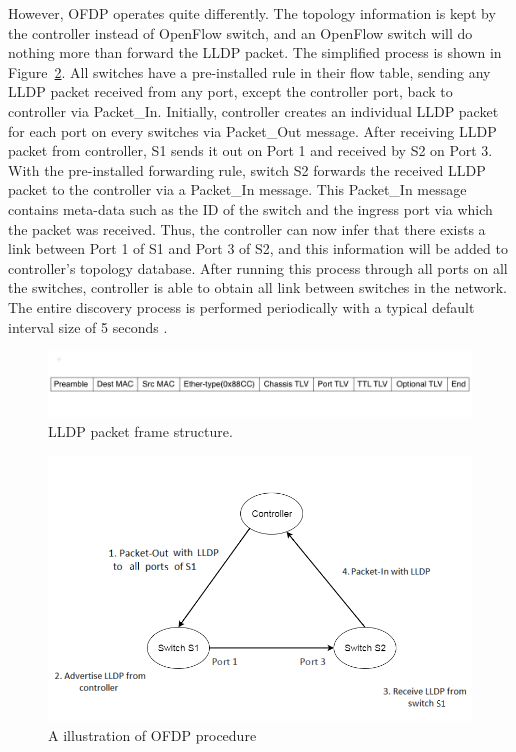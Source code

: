 However, OFDP operates quite differently. The topology information is kept by the controller instead of OpenFlow switch, and an OpenFlow switch will do nothing more than forward the LLDP packet. The simplified process is shown in Figure~\ref{OFDP}. All switches have a pre-installed rule in their flow table, sending any LLDP packet received from any port, except the controller port, back to controller via Packet\_In. Initially, controller creates an individual LLDP packet for each port on every switches via Packet\_Out message. After receiving LLDP packet from controller, S1 sends it out on Port 1 and received by S2 on Port 3. With the pre-installed forwarding rule, switch S2 forwards the received LLDP packet to the controller via a Packet\_In message. This Packet\_In message contains meta-data such as the ID of the switch and the ingress port via which the packet was received. Thus, the controller can now infer that there exists a link between Port 1 of S1 and Port 3 of S2, and this information will be added to controller's topology database. After running this process through all ports on all the switches, controller is able to obtain all link between switches in the network. The entire discovery process is performed periodically with a typical default interval size of 5 seconds \cite{PPTI14}. 

\begin{figure}[H]
\begin{center} 
\includegraphics[width=1\textwidth]{figures/LLDP_packet_format.png}
\end{center}
\caption{LLDP packet frame structure. \cite{LLDP_WS}}
\label{LLDP_frame}
\end{figure}

\begin{figure}[H]
\begin{center} 
\includegraphics[width=1\textwidth]{figures/OFDP_procedure.png}
\end{center}
\caption{A illustration of OFDP procedure}
\label{OFDP}
\end{figure}

